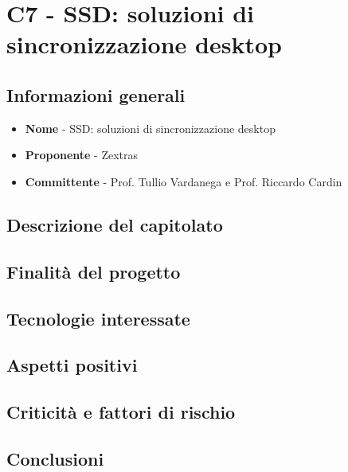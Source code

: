 \chapter{C7 - SSD: soluzioni di sincronizzazione desktop}
\section{Informazioni generali}
\begin{itemize}
	\item \textbf{Nome} - SSD: soluzioni di sincronizzazione desktop
	\item \textbf{Proponente} - Zextras
	\item \textbf{Committente} - Prof. Tullio Vardanega e Prof. Riccardo Cardin
\end{itemize}
\section{Descrizione del capitolato}
\section{Finalità del progetto}
\section{Tecnologie interessate}
\section{Aspetti positivi}
\section{Criticità e fattori di rischio}
\section{Conclusioni}